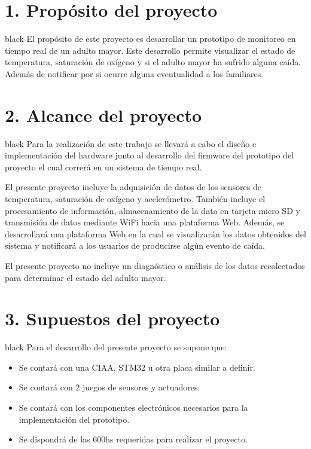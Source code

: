 \documentclass[11pt]{charter}
\begin{document}
\section{1. Propósito del proyecto}
\label{sec:proposito}

\begin{consigna}{black}
El propósito de este proyecto es desarrollar un prototipo de monitoreo en tiempo real de un adulto mayor. Este desarrollo permite visualizar el estado de temperatura, saturación de oxígeno y si el adulto mayor ha sufrido alguna caída. Además de notificar por si ocurre alguna eventualidad a los familiares. 

\end{consigna}

\section{2. Alcance del proyecto}
\label{sec:alcance}

\begin{consigna}{black}
Para la realización de este trabajo se llevará a cabo el diseño e implementación del hardware junto al desarrollo del firmware del prototipo del proyecto el cual correrá en un sistema de tiempo real. 

El presente proyecto incluye la adquisición de datos de los sensores de temperatura, saturación de oxígeno y acelerómetro. También incluye el procesamiento de información, almacenamiento de la data en tarjeta micro SD y transmisión de datos mediante WiFi hacia una plataforma Web. Además, se desarrollará una plataforma Web en la cual se visualizarán los datos obtenidos del sistema y notificará a los usuarios de producirse algún evento de caída.   

El presente proyecto no incluye un diagnóstico o análisis de los datos recolectados para determinar el estado del adulto mayor.

\end{consigna}


\section{3. Supuestos del proyecto}
\label{sec:supuestos}

\begin{consigna}{black}
Para el desarrollo del presente proyecto se supone que:

\begin{itemize}
\item Se contará con una CIAA, STM32 u otra placa similar a definir. 
\item Se contará con 2 juegos de sensores y actuadores.
\item Se contará con los componentes electrónicos necesarios para la implementación del prototipo.
\item Se dispondrá de las 600hs requeridas para realizar el proyecto. 
\end{itemize}

\end{consigna}
\end{document}
